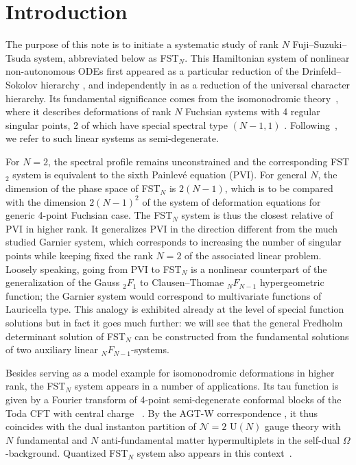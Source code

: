 \documentclass[pdftex]{sigma}
\numberwithin{equation}{section}
\begin{document}


\renewcommand{\thefootnote}{\arabic{footnote}}
\setcounter{footnote}{0}

\section{Introduction}

The purpose of this note is to initiate a systematic study of rank $N$ Fuji--Suzuki--Tsuda system, abbreviated below as FST$_N$. This Hamiltonian system of nonlinear non-autonomous ODEs first appeared as a particular reduction of the Drinfeld--Sokolov hierarchy \cite{FS,Suzuki1}, and independently in \cite{Tsuda0} as a reduction of the universal character hierarchy. Its fundamental significance comes from the isomonodromic theory~\cite{FIKN}, where it describes deformations of rank $N$ Fuchsian systems with 4 regular singular points, 2 of which have special spectral type $(N-1,1)$ \cite{Tsuda0,Tsuda}. Following~\cite{GIL18}, we refer to such linear systems as semi-degenerate.

For $N=2$, the spectral profile remains unconstrained and the corresponding FST$_2$ system is equivalent to the sixth Painlev\'e equation (PVI). For general $N$, the dimension of the phase space of FST$_N$ is $2(N-1)$, which is to be compared with the dimension $2(N-1)^2$ of the system of deformation equations for generic 4-point Fuchsian case. The FST$_N$ system is thus the closest relative of PVI in higher rank. It generalizes PVI in the direction different from the much studied Garnier system, which corresponds to increasing the number of singular points while keeping fixed the rank $N=2$ of the associated linear problem.
Loosely speaking, going from PVI to FST$_N$ is a nonlinear counterpart of the generalization of the Gauss $_2F_1$ to Clausen--Thomae $_N F_{N-1}$ hypergeometric function; the Garnier system would correspond to multivariate functions of Lauricella type. This analogy is exhibited already at the level of special function solutions but in fact it goes much further: we will see that the general Fredholm determinant solution of FST$_N$ can be constructed from the fundamental solutions of two auxiliary linear $_N F_{N-1}$-systems.

Besides serving as a model example for isomonodromic deformations in higher rank, the FST$_N$ system appears in a number of applications. Its tau function is given by a Fourier transform of 4-point semi-degenerate conformal blocks of the Toda CFT with central charge ~\cite{GIL18}. By the AGT-W correspondence \cite{AGT,FL3,MM,Wyl}, it thus coincides with the dual instanton partition of $\mathcal N=2$ $\mathrm{U}(N)$ gauge theory with $N$ fundamental and $N$ anti-fundamental matter hypermultiplets in the self-dual $\Omega$-background. Quantized FST$_N$ system also appears in this context~\cite{Yamada}.
\end{document}
